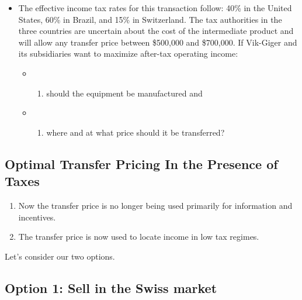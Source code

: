 \begin{itemize}
\tightlist
\item
  The effective income tax rates for this transaction follow: 40\% in
  the United States, 60\% in Brazil, and 15\% in Switzerland. The tax
  authorities in the three countries are uncertain about the cost of the
  intermediate product and will allow any transfer price between
  \$500,000 and \$700,000. If Vik-Giger and its subsidiaries want to
  maximize after-tax operating income:

  \begin{itemize}
  \item
    \begin{enumerate}
    \def\labelenumi{(\alph{enumi})}
    \tightlist
    \item
      should the equipment be manufactured and
    \end{enumerate}
  \item
    \begin{enumerate}
    \def\labelenumi{(\alph{enumi})}
    \setcounter{enumi}{1}
    \tightlist
    \item
      where and at what price should it be transferred?
    \end{enumerate}
  \end{itemize}
\end{itemize}

\hypertarget{optimal-transfer-pricing-in-the-presence-of-taxes}{%
\subsection{Optimal Transfer Pricing In the Presence of
Taxes}\label{optimal-transfer-pricing-in-the-presence-of-taxes}}

\begin{enumerate}
\def\labelenumi{\arabic{enumi}.}
\tightlist
\item
  Now the transfer price is no longer being used primarily for
  information and incentives.
\item
  The transfer price is now used to locate income in low tax regimes.
\end{enumerate}

Let's consider our two options.

\hypertarget{option-1-sell-in-the-swiss-market}{%
\subsection{Option 1: Sell in the Swiss
market}\label{option-1-sell-in-the-swiss-market}}

